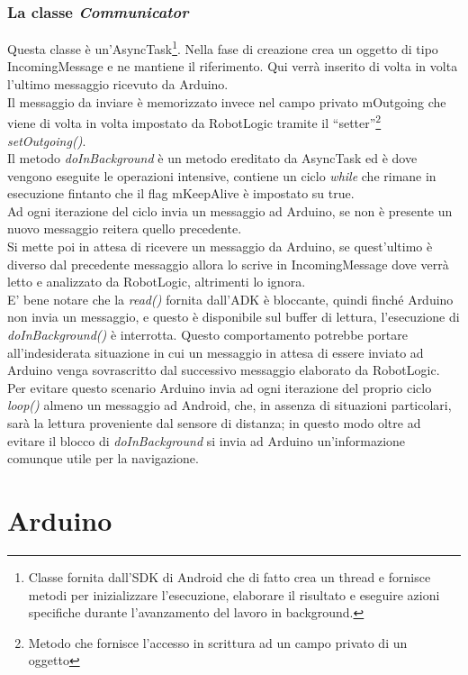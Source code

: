 \subsubsection{La classe \emph{Communicator}}
Questa classe è un'AsyncTask\footnote{Classe fornita dall'SDK di Android che di fatto 
crea un thread e fornisce metodi per inizializzare l'esecuzione, elaborare il 
risultato e eseguire azioni specifiche durante l'avanzamento del lavoro in background.}.
Nella fase di creazione crea un oggetto di tipo IncomingMessage e ne mantiene il riferimento. 
Qui verrà inserito di volta in volta l'ultimo messaggio ricevuto da Arduino.\\
Il messaggio da inviare è memorizzato invece nel campo privato mOutgoing che viene di volta 
in volta impostato da RobotLogic tramite il ``setter''\footnote{Metodo che fornisce 
l'accesso in scrittura ad un campo privato di un oggetto} \emph{setOutgoing()}.\\
Il metodo \emph{doInBackground} è un metodo ereditato da AsyncTask ed è dove vengono 
eseguite le operazioni intensive, contiene un ciclo \emph{while} che rimane in esecuzione 
fintanto che il flag mKeepAlive è impostato su true.\\
Ad ogni iterazione del ciclo invia un messaggio ad Arduino, se non è presente un nuovo 
messaggio reitera quello precedente.\\
Si mette poi in attesa di ricevere un messaggio da Arduino, se quest'ultimo è 
diverso dal precedente messaggio allora lo scrive in IncomingMessage dove verrà
letto e analizzato da RobotLogic, altrimenti lo ignora.\\
E' bene notare che la \emph{read()} fornita dall'ADK è bloccante, quindi finché Arduino
non invia un messaggio, e questo è disponibile sul buffer di lettura, l'esecuzione di 
\emph{doInBackground()} è interrotta. Questo comportamento potrebbe portare 
all'indesiderata situazione in cui un messaggio in attesa di essere inviato ad Arduino
venga sovrascritto dal successivo messaggio elaborato da RobotLogic. Per evitare questo scenario
Arduino invia ad ogni iterazione del proprio ciclo \emph{loop()} almeno un messaggio ad
Android, che, in assenza di situazioni particolari, sarà la lettura proveniente dal 
sensore di distanza; in questo modo oltre ad evitare il blocco di \emph{doInBackground} 
si invia ad Arduino un'informazione comunque utile per la navigazione.

\section {Arduino} 